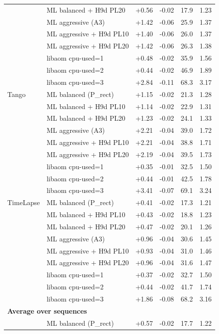 \begin{table}[t]
\begin{tabular}{llrrrr}
 & ML balanced + H9d PL20 & +0.56 & -0.02 & 17.9 & 1.23 \\
 & ML aggressive (A3) & +1.42 & -0.06 & 25.9 & 1.37 \\
 & ML aggressive + H9d PL10 & +1.40 & -0.06 & 26.0 & 1.37 \\
 & ML aggressive + H9d PL20 & +1.42 & -0.06 & 26.3 & 1.38 \\
 & libaom cpu-used=1 & +0.48 & -0.02 & 35.9 & 1.56 \\
 & libaom cpu-used=2 & +0.44 & -0.02 & 46.9 & 1.89 \\
 & libaom cpu-used=3 & +2.84 & -0.11 & 68.3 & 3.17 \\
\midrule
Tango & ML balanced (P\_rect) & +1.15 & -0.02 & 21.3 & 1.28 \\
 & ML balanced + H9d PL10 & +1.14 & -0.02 & 22.9 & 1.31 \\
 & ML balanced + H9d PL20 & +1.23 & -0.02 & 24.1 & 1.33 \\
 & ML aggressive (A3) & +2.21 & -0.04 & 39.0 & 1.72 \\
 & ML aggressive + H9d PL10 & +2.21 & -0.04 & 38.8 & 1.71 \\
 & ML aggressive + H9d PL20 & +2.19 & -0.04 & 39.5 & 1.73 \\
 & libaom cpu-used=1 & +0.35 & -0.01 & 32.5 & 1.50 \\
 & libaom cpu-used=2 & +0.44 & -0.01 & 42.5 & 1.78 \\
 & libaom cpu-used=3 & +3.41 & -0.07 & 69.1 & 3.24 \\
\midrule
TimeLapse & ML balanced (P\_rect) & +0.41 & -0.02 & 17.3 & 1.21 \\
 & ML balanced + H9d PL10 & +0.43 & -0.02 & 18.8 & 1.23 \\
 & ML balanced + H9d PL20 & +0.47 & -0.02 & 20.1 & 1.26 \\
 & ML aggressive (A3) & +0.96 & -0.04 & 30.6 & 1.45 \\
 & ML aggressive + H9d PL10 & +0.93 & -0.04 & 31.0 & 1.46 \\
 & ML aggressive + H9d PL20 & +0.96 & -0.04 & 31.6 & 1.47 \\
 & libaom cpu-used=1 & +0.37 & -0.02 & 32.7 & 1.50 \\
 & libaom cpu-used=2 & +0.44 & -0.02 & 41.7 & 1.74 \\
 & libaom cpu-used=3 & +1.86 & -0.08 & 68.2 & 3.16 \\
\midrule
\multicolumn{6}{l}{\textbf{Average over sequences}} \\
\midrule
 & ML balanced (P\_rect) & +0.57 & -0.02 & 17.7 & 1.22 \\

\end{tabular}
\end{table}
